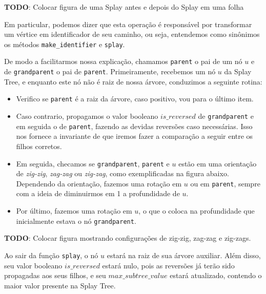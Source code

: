 \begin{center}
    \textbf{TODO}: Colocar figura de uma Splay antes e depois do Splay em uma folha
\end{center}

Em particular, podemos dizer que esta operação é responsável por transformar um vértice em identificador de seu caminho, ou seja, entendemos como sinônimos os métodos \texttt{make\_identifier} e \texttt{splay}.

De modo a facilitarmos nossa explicação, chamamos \texttt{parent} o pai de um nó $u$ e de \texttt{grandparent} o pai de \texttt{parent}. Primeiramente, recebemos um nó $u$ da Splay Tree, e enquanto este nó não é raiz de nossa árvore, conduzimos a seguinte rotina:

\begin{itemize}
    \item Verifico se \texttt{parent} é a raiz da árvore, caso positivo, vou para o último item.
    \item Caso contrario, propagamos o valor booleano $is\_reversed$ de \texttt{grandparent} e em seguida o de \texttt{parent}, fazendo as devidas reversões caso necessárias. Isso nos fornece a invariante de que iremos fazer a comparação a seguir entre os filhos corretos.
    \item Em seguida, checamos se \texttt{grandparent}, \texttt{parent} e $u$ estão em uma orientação de \textit{zig-zig}, \textit{zag-zag} ou \textit{zig-zag}, como exemplificadas na figura abaixo. Dependendo da orientação, fazemos uma rotação em $u$ ou em \texttt{parent}, sempre com a ideia de diminuirmos em 1 a profundidade de $u$.
    \item Por último, fazemos uma rotação em $u$, o que o coloca na profundidade que inicialmente estava o nó \texttt{grandparent}.
\end{itemize}

\begin{center}
    \textbf{TODO}: Colocar figura mostrando configurações de zig-zig, zag-zag e zig-zags.
\end{center}

Ao sair da função \texttt{splay}, o nó $u$ estará na raiz de sua árvore auxiliar. Além disso, seu valor booleano $is\_reversed$ estará nulo, pois as reversões já terão sido propagadas aos seus filhos, e seu $max\_subtree\_value$ estará atualizado, contendo o maior valor presente na Splay Tree.

